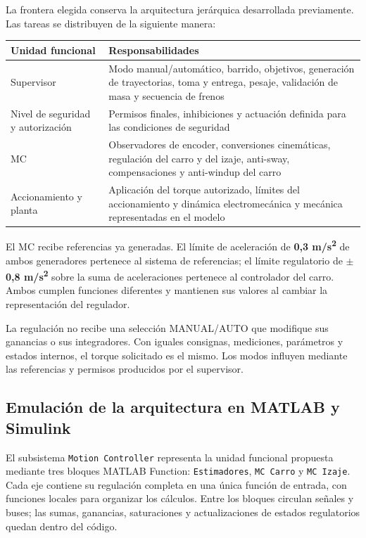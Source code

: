 \documentclass[a4paper,10pt,onecolumn,journal]{ieeeconf}
\numberwithin{equation}{section}
\begin{document}
La frontera elegida conserva la arquitectura jerárquica desarrollada previamente. Las tareas se distribuyen de la siguiente manera:

\begin{table}[H]
\centering
{\small
\begin{tabular}{@{}L{0.34\textwidth}L{0.60\textwidth}@{}}
\toprule
Unidad funcional & Responsabilidades\\
\midrule
Supervisor & Modo manual/automático, barrido, objetivos, generación de trayectorias, toma y entrega, pesaje, validación de masa y secuencia de frenos\\
Nivel de seguridad y autorización & Permisos finales, inhibiciones y actuación definida para las condiciones de seguridad\\
MC & Observadores de encoder, conversiones cinemáticas, regulación del carro y del izaje, anti-sway, compensaciones y anti-windup del carro\\
Accionamiento y planta & Aplicación del torque autorizado, límites del accionamiento y dinámica electromecánica y mecánica representadas en el modelo\\
\bottomrule
\end{tabular}
}
\end{table}

El MC recibe referencias ya generadas. El límite de aceleración de \textbf{0,3 m/s\textsuperscript{2}} de ambos generadores pertenece al sistema de referencias; el límite regulatorio de \textbf{\(\pm\)0,8 m/s\textsuperscript{2}} sobre la suma de aceleraciones pertenece al controlador del carro. Ambos cumplen funciones diferentes y mantienen sus valores al cambiar la representación del regulador.

La regulación no recibe una selección MANUAL/AUTO que modifique sus ganancias o sus integradores. Con iguales consignas, mediciones, parámetros y estados internos, el torque solicitado es el mismo. Los modos influyen mediante las referencias y permisos producidos por el supervisor.


\subsection{Emulación de la arquitectura en MATLAB y Simulink}

El subsistema \texttt{Motion Controller} representa la unidad funcional propuesta mediante tres bloques MATLAB Function: \texttt{Estimadores}, \texttt{MC Carro} y \texttt{MC Izaje}. Cada eje contiene su regulación completa en una única función de entrada, con funciones locales para organizar los cálculos. Entre los bloques circulan señales y buses; las sumas, ganancias, saturaciones y actualizaciones de estados regulatorios quedan dentro del código.
\end{document}
